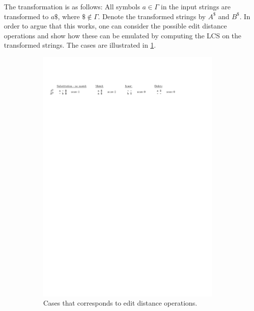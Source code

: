 \documentclass[twoside,11pt,openright]{report}
\begin{document}
The transformation is as follows: All symbols $a \in \Gamma$ in the input strings are transformed to $a\$$, where $\$ \not\in \Gamma$. Denote the transformed strings by $A^{\$}$ and $B^{\$}$. In order to argue that this works, one can consider the possible edit distance operations and show how these can be emulated by computing the LCS on the transformed strings. The cases are illustrated in \cref{fig:blow-up:edit-dist-cases}.

\begin{figure}[!htb]
  \centering
  \begin{subfigure}{0.9\textwidth}
    \includegraphics[width=\textwidth]{images/blow-up-edit-dist-cases}
    \caption{Cases that corresponds to edit distance operations.}
    \label{fig:blow-up:edit-dist-cases}
  \end{subfigure}
  \begin{subfigure}{0.8\textwidth}

\end{subfigure}
\end{figure}
\end{document}

